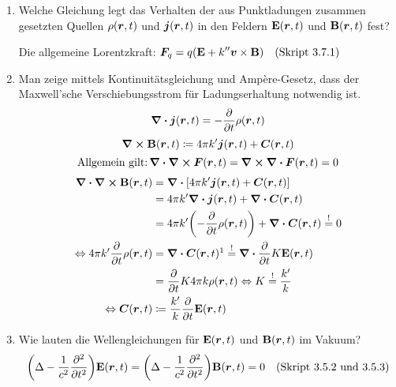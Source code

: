 \begin{enumerate}
  \item Welche Gleichung legt das Verhalten der aus Punktladungen
        zusammen gesetzten Quellen $\rho(\vb* r, t)$ und 
        $\vb* j(\vb* r, t)$ in den Feldern $\vb E(\vb* r, t)$
        und $\vb B(\vb* r, t)$ fest?
        \begin{center}
          Die allgemeine Lorentzkraft: 
          $\displaystyle \vb* F_q=q\qty(\vb E+k''\vb* v\times\vb B)\quad\text{(Skript 3.7.1)}$
        \end{center}

  \item Man zeige mittels Kontinuitätsgleichung und Ampère-Gesetz, 
        dass der Maxwell'sche Verschiebungsstrom für Ladungserhaltung
        notwendig ist.
        $$\div \vb* j(\vb* r, t) = -\pdv{t}\rho(\vb* r ,t)$$
        $$\curl\vb B(\vb* r, t) \coloneqq 
        4\pi k'\vb* j(\vb* r ,t) + \vb* C(\vb* r, t)$$
        $$\text{Allgemein gilt:}\,\div\curl\vb* F(\vb* r, t)
        =\curl \div \vb* F(\vb* r, t)=0$$
        \begin{equation*}
          \begin{split}
          \ds \div\curl\vb B(\vb* r, t)
                      &\ds= \div \qty[
                      4\pi k'\vb* j(\vb* r, t)+\vb* C(\vb* r, t)]\\
                      &\ds= 4\pi k'\div\vb* j(\vb* r,t) +
                      \div \vb* C(\vb* r,t)\\
                      &\ds= 4\pi k'\qty(-\pdv{t}\rho(\vb* r, t)) 
                      +\div \vb* C(\vb* r,t)\stackrel{!}{=}0\\
          \Leftrightarrow\ds 4\pi k'\pdv{t}\rho(\vb* r, t) 
                      &\ds =\div \vb* 
                      C(\vb* r, t)\footnotemark
                      \stackrel{!}{=}\div \pdv{t}K\vb E(\vb* r, t)\\
                      &\ds =\ds \pdv{t} 
                      K4\pi k \rho(\vb* r, t)
          \Leftrightarrow K         
                      \stackrel{!}{=}\frac{k'}{k}\\
          \Leftrightarrow \vb* C(\vb* r,t)
                      &\coloneqq \frac{k'}{k}\pdv{t}\vb E(\vb* r, t)
          \end{split}
        \end{equation*}

  \item Wie lauten die Wellengleichungen für $\vb E(\vb* r, t)$ und
        $\vb B(\vb* r, t)$ im Vakuum?
        $$\qty(\Delta - \frac{1}{c^2}\pdv[2]{t})\vb E(\vb* r, t)=
        \qty(\Delta - \frac{1}{c^2}\pdv[2]{t})\vb B(\vb* r, t)=0
        \quad\text{(Skript 3.5.2 und 3.5.3)}$$


\end{enumerate}
